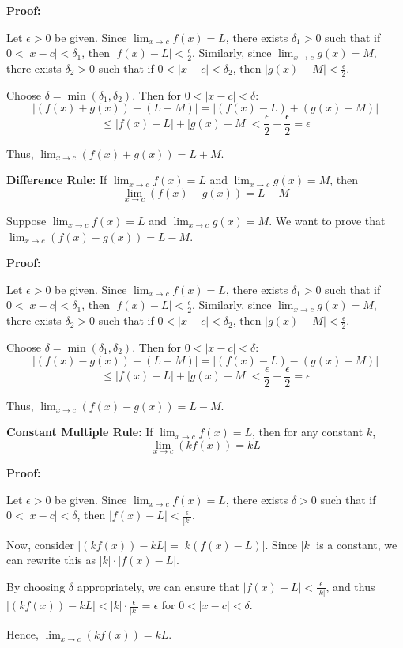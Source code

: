 \textbf{Proof:} \begin{outline}
Let $\epsilon > 0$ be given. Since $\lim_{x \to c} f(x) = L$, there exists $\delta_1 > 0$ such that if $0 < |x - c| < \delta_1$, then $|f(x) - L| < \frac{\epsilon}{2}$.
Similarly, since $\lim_{x \to c} g(x) = M$, there exists $\delta_2 > 0$ such that if $0 < |x - c| < \delta_2$, then $|g(x) - M| < \frac{\epsilon}{2}$.

Choose $\delta = \min(\delta_1, \delta_2)$. Then for $0 < |x - c| < \delta$:
\[ |(f(x) + g(x)) - (L + M)| = |(f(x) - L) + (g(x) - M)| \]
\[ \leq |f(x) - L| + |g(x) - M| < \frac{\epsilon}{2} + \frac{\epsilon}{2} = \epsilon \]

Thus, $\lim_{x \to c} (f(x) + g(x)) = L + M$.

\end{outline} \vspace{1cm} \hline

\textbf{Difference Rule:} If $\lim_{x \to c} f(x) = L$ and $\lim_{x \to c} g(x) = M$, then
\[ \lim_{x \to c} (f(x) - g(x)) = L - M \]

Suppose $\lim_{x \to c} f(x) = L$ and $\lim_{x \to c} g(x) = M$. We want to prove that $\lim_{x \to c} (f(x) - g(x)) = L - M$.

\textbf{Proof:} \begin{outline} 
Let $\epsilon > 0$ be given. Since $\lim_{x \to c} f(x) = L$, there exists $\delta_1 > 0$ such that if $0 < |x - c| < \delta_1$, then $|f(x) - L| < \frac{\epsilon}{2}$.
Similarly, since $\lim_{x \to c} g(x) = M$, there exists $\delta_2 > 0$ such that if $0 < |x - c| < \delta_2$, then $|g(x) - M| < \frac{\epsilon}{2}$.

Choose $\delta = \min(\delta_1, \delta_2)$. Then for $0 < |x - c| < \delta$:
\[ |(f(x) - g(x)) - (L - M)| = |(f(x) - L) - (g(x) - M)| \]
\[ \leq |f(x) - L| + |g(x) - M| < \frac{\epsilon}{2} + \frac{\epsilon}{2} = \epsilon \]

Thus, $\lim_{x \to c} (f(x) - g(x)) = L - M$.

\end{outline} \vspace{1cm} \hline


\textbf{Constant Multiple Rule:} If $\lim_{x \to c} f(x) = L$, then for any constant $k$,
\[ \lim_{x \to c} (kf(x)) = kL \]

\textbf{Proof:} \begin{outline} 
Let $\epsilon > 0$ be given. Since $\lim_{x \to c} f(x) = L$, there exists $\delta > 0$ such that if $0 < |x - c| < \delta$, then $|f(x) - L| < \frac{\epsilon}{|k|}$.

Now, consider $|(kf(x)) - kL| = |k(f(x) - L)|$. Since $|k|$ is a constant, we can rewrite this as $|k| \cdot |f(x) - L|$.

By choosing $\delta$ appropriately, we can ensure that $|f(x) - L| < \frac{\epsilon}{|k|}$, and thus $|(kf(x)) - kL| < |k| \cdot \frac{\epsilon}{|k|} = \epsilon$ for $0 < |x - c| < \delta$.

Hence, $\lim_{x \to c} (kf(x)) = kL$.


\end{outline} \vspace{1cm} \hline


